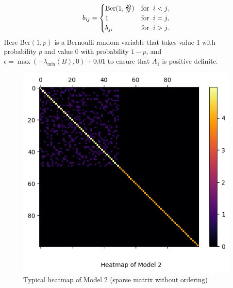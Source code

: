 \begin{enumerate}
\begin{equation}
        b_{ij} = \begin{cases}
            \text{Ber}(1, \frac{20}{N}) &\text{for}\hspace{2mm} i<j, \\
            1 & \text{for}\hspace{2mm}i=j, \\
            b_{ji} & \text{for}\hspace{2mm}i>j.
        \end{cases}
    \end{equation}
     Here $\text{Ber}(1, p)$ is a Bernoulli random variable that takes value 1 with probability $p$ and value 0 with probability $1-p$, and $\epsilon = \max(-\lambda_{\min} (B), 0) + 0.01$ to ensure that $A_1$ is positive definite. 
        \begin{figure}[H]
        \centering
\includegraphics[scale=0.75]{simulation_result/pic_model2.png}
         \caption{Typical heatmap of Model 2 (sparse matrix without ordering)}
        \label{fig:model2}
    \end{figure}
\end{enumerate}

